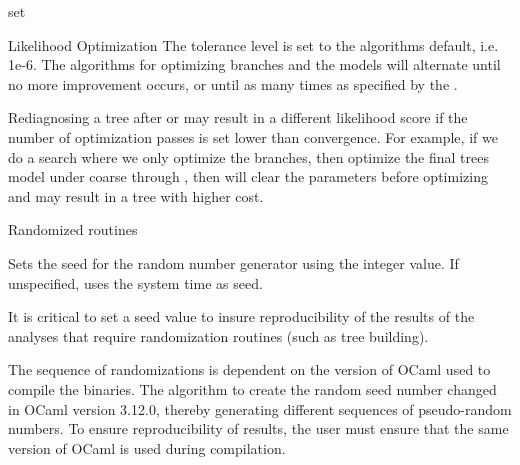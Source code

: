 \begin{command}{set}{}
\begin{arguments}
\begin{argumentgroup}{Likelihood Optimization}
                {The tolerance level is set to the algorithms default, i.e. 1e-6. 
                The algorithms for optimizing branches and the models 
                will alternate until no more improvement occurs, or
                until as many times as specified by the \poyint.}
                {}

	   \begin{statement}
                Rediagnosing a tree after  or
                 may result in a different likelihood score if
                the number of optimization passes is set lower than convergence.
                For example, if we do a search where we only optimize the
                branches, then optimize the final trees model under coarse
                through , then \poy will clear the
                parameters before optimizing and may result in a tree with
                higher cost.
            \end{statement}

        \end{argumentgroup}
        
        \begin{argumentgroup}{Randomized routines}
            {}

                {Sets the seed for the random number generator using the integer 
                value. If unspecified, \poy uses the system time as seed.}
                {}
        	\begin{statement}
  	            It is critical to set a seed value to insure reproducibility of
                the results of the analyses that require randomization routines
                (such as tree building).
	        \end{statement}
	 
	        \begin{statement}
	            The sequence of randomizations is dependent on the version of
                OCaml used to compile the binaries. The algorithm to create the
                random seed number changed in OCaml version 3.12.0, thereby
                generating different sequences of pseudo-random numbers.  To
                ensure reproducibility of results, the user must ensure that the
                same version of OCaml is used during compilation.
            \end{statement}
	

\end{argumentgroup}
\end{arguments}
\end{command}
